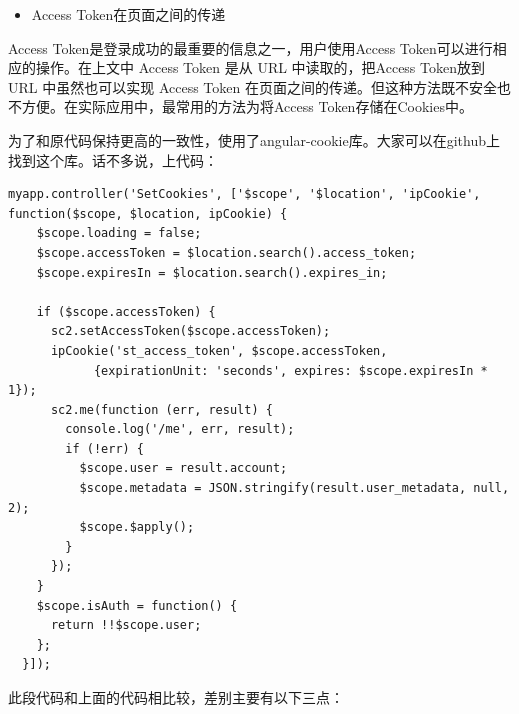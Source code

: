 \documentclass[]{ctexbook}
\providecommand{\tightlist}{%
  \setlength{\itemsep}{0pt}\setlength{\parskip}{0pt}}
\begin{document}
\begin{itemize}
\tightlist
\item
  Access Token在页面之间的传递
\end{itemize}

Access Token是登录成功的最重要的信息之一，用户使用Access Token可以进行相应的操作。在上文中 Access Token 是从 URL 中读取的，把Access Token放到 URL 中虽然也可以实现 Access Token 在页面之间的传递。但这种方法既不安全也不方便。在实际应用中，最常用的方法为将Access Token存储在Cookies中。

为了和原代码保持更高的一致性，使用了angular-cookie库。大家可以在github上找到这个库。话不多说，上代码：

\begin{verbatim}
myapp.controller('SetCookies', ['$scope', '$location', 'ipCookie', function($scope, $location, ipCookie) {
    $scope.loading = false;    
    $scope.accessToken = $location.search().access_token;
    $scope.expiresIn = $location.search().expires_in;

    if ($scope.accessToken) {
      sc2.setAccessToken($scope.accessToken);
      ipCookie('st_access_token', $scope.accessToken, 
            {expirationUnit: 'seconds', expires: $scope.expiresIn * 1});
      sc2.me(function (err, result) {
        console.log('/me', err, result);
        if (!err) {
          $scope.user = result.account;
          $scope.metadata = JSON.stringify(result.user_metadata, null, 2);
          $scope.$apply();
        }
      });
    }
    $scope.isAuth = function() {
      return !!$scope.user;
    };
  }]);
\end{verbatim}

此段代码和上面的代码相比较，差别主要有以下三点：
\end{document}

